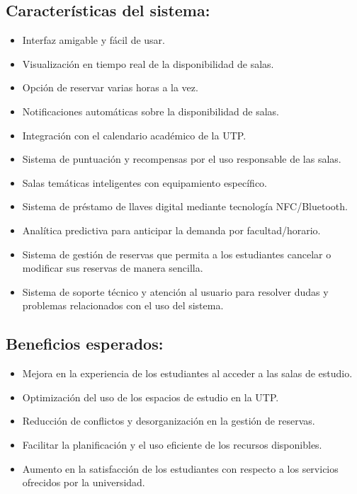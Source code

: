 \documentclass{article}
\begin{document}
  \subsection{Características del sistema:}
  \begin{itemize}
    \item Interfaz amigable y fácil de usar.
    \item Visualización en tiempo real de la disponibilidad de salas.
    \item Opción de reservar varias horas a la vez.
    \item Notificaciones automáticas sobre la disponibilidad de salas.
    \item Integración con el calendario académico de la UTP.
    \item Sistema de puntuación y recompensas por el uso responsable de las salas.
    \item Salas temáticas inteligentes con equipamiento específico.
    \item Sistema de préstamo de llaves digital mediante tecnología NFC/Bluetooth.
    \item Analítica predictiva para anticipar la demanda por facultad/horario.
    \item Sistema de gestión de reservas que permita a los estudiantes cancelar o modificar sus reservas de manera sencilla.
    \item Sistema de soporte técnico y atención al usuario para resolver dudas y problemas relacionados con el uso del sistema.
    \end{itemize}
  \subsection{Beneficios esperados:}
  \begin{itemize}
    \item Mejora en la experiencia de los estudiantes al acceder a las salas de estudio.
    \item Optimización del uso de los espacios de estudio en la UTP.
    \item Reducción de conflictos y desorganización en la gestión de reservas.
    \item Facilitar la planificación y el uso eficiente de los recursos disponibles.
    \item Aumento en la satisfacción de los estudiantes con respecto a los servicios ofrecidos por la universidad.
    \end{itemize}
\end{document}
